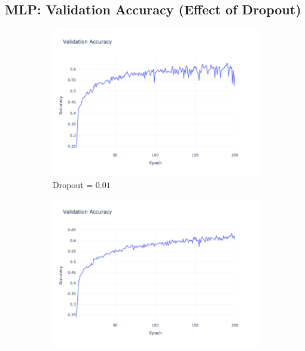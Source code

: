 \subsection{MLP: Validation Accuracy (Effect of Dropout)}
\begin{figure}[htbp!]
    \centering
    \begin{subfigure}{0.32\textwidth}
        \centering
        \includegraphics[width=\textwidth]{images/mlp-validation-accuracy-batch-64-lr-0.002-epochs-200-hidden-200-dropout-0.01-l2-0.0-layers-2-act-relu-opt-sgd-mom-0.0.png}
        \caption{Dropout = $0.01$}
    \end{subfigure}
    \begin{subfigure}{0.32\textwidth}
        \centering
        \includegraphics[width=\textwidth]{images/mlp-validation-accuracy-batch-64-lr-0.002-epochs-200-hidden-200-dropout-0.25-l2-0.0-layers-2-act-relu-opt-sgd-mom-0.0.png}

\end{subfigure}
\end{figure}

